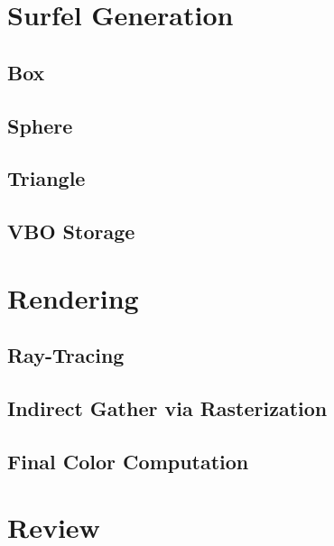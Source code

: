 \section{Surfel Generation}
\label{sec:surfel_generation}

\subsection{Box}

\subsection{Sphere}

\subsection{Triangle}

\subsection{VBO Storage}

\section{Rendering}
\label{sec:rendering}

\subsection{Ray-Tracing}

\subsection{Indirect Gather via Rasterization}

\subsection{Final Color Computation}

\section{Review}

